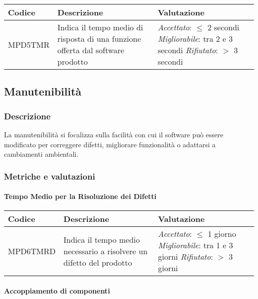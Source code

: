 \begin{table}[h]
\centering
\begin{tabular}{ |>{\centering\arraybackslash}m{3cm}|>{\centering\arraybackslash}m{8cm}|>{\centering\arraybackslash}m{5cm}| }
\hline
Codice & Descrizione & Valutazione\\
\hline
MPD5TMR & Indica il tempo medio di risposta di una funzione offerta dal software prodotto &
\textit{Accettato}:  $\leq$ 2 secondi
\textit{Migliorabile}: tra 2 e 3 secondi
\textit{Rifiutato}: $>$ 3 secondi\\
\hline
\end{tabular}
\end{table}

\subsection{Manutenibilità}
\subsubsection{Descrizione}
La manutenibilità si focalizza sulla facilità con cui il software può essere modificato per correggere difetti, migliorare funzionalità o adattarsi a cambiamenti ambientali.
\subsubsection{Metriche e valutazioni}
\paragraph{ Tempo Medio per la Risoluzione dei Difetti}

\begin{table}[h]
\centering
\begin{tabular}{ |>{\centering\arraybackslash}m{3cm}|>{\centering\arraybackslash}m{8cm}|>{\centering\arraybackslash}m{5cm}| }
\hline
Codice & Descrizione & Valutazione\\
\hline
MPD6TMRD & Indica il tempo medio necessario a risolvere un difetto del prodotto & \textit{Accettato}: $\leq$ 1 giorno
\textit{Migliorabile}: tra 1 e 3 giorni
\textit{Rifiutato}: $>$ 3 giorni\\
\hline
\end{tabular}
\end{table}

\newpage

\paragraph{Accoppiamento di componenti}

